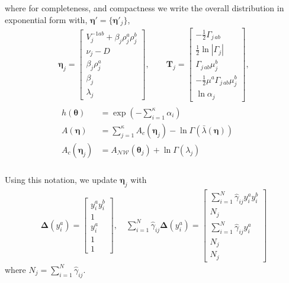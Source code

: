 \documentclass[aps,showpacs,twocolumn,prd,superscriptaddress,nofootinbib]{revtex4}
\newcommand{\nn}{\nonumber}
\begin{document}
    where for completeness, and compactness we write the overall distribution in exponential form with,  $\bm\eta'=\{\bm\eta'_j\}$,
\begin{align}
  \bm\eta_j=
  \begin{bmatrix}
    V_j^{-1ab}+\beta_j\rho_j^a\rho_j^b\\[.7ex]
    \nu_j-D\\[.7ex]
    \beta_j\rho_j^a\\[.7ex]
    \beta_j\\[.7ex]
    \lambda_j
  \end{bmatrix},\qquad
\bm T_j=
\begin{bmatrix}
  -\frac12\Gamma_{j\,ab}\\[.7ex]
  \frac12\ln\left|\Gamma_j\right|\\[.7ex]
  \Gamma_{j\,ab}\mu_j^b\\[.7ex]
  -\frac12\mu^a\Gamma_{j\,ab}\mu_j^b\\[.7ex]
  \ln\alpha_j
\end{bmatrix},\nn\\
\begin{aligned}
  h(\bm \theta)&=\exp\left(-\sum_{i=1}^\kappa\alpha_i\right)\nn\\
  A(\bm\eta)&=\sum_{j=1}^\kappa A_c(\bm\eta_j)-\ln\Gamma(\bar\lambda(\bm\eta))\\
  A_c(\bm\eta_j)&=A_{\mathcal{NW}}(\bm\theta_j)+\ln \Gamma(\lambda_j)\nn\\
\end{aligned}
\end{align}

Using this notation, we update $\bm\eta_j$ with 
\begin{align}
  \bm\Delta(y_i^a)=
  \begin{bmatrix}
    y_i^ay_i^b\\[1ex]
    1\\[1ex]
    y_i^a\\[1ex]
    1\\[1ex]
    1
  \end{bmatrix},\quad
  \sum_{i=1}^N\hat\gamma_{ij}\bm \Delta(y_i^a)=
  \begin{bmatrix}
    \sum_{i=1}^N\hat\gamma_{ij}y_i^ay_i^b\\[.7ex]
    N_j\\[.7ex]
    \sum_{i=1}^N\hat\gamma_{ij}y_i^a\\[1ex]
    N_j\\[1ex]
    N_j
  \end{bmatrix}
\end{align}
where $N_j=\sum_{i=1}^N\hat\gamma_{ij}$.
\end{document}
